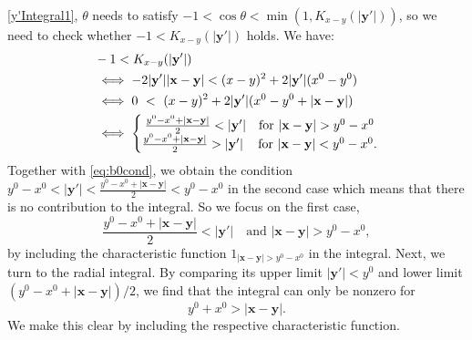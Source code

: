 \documentclass[b5paper,draft,openbib,12pt]{memoir}
\newcommand{\vx}{\mathbf{x}}
\newcommand{\vy}{\mathbf{y}}
\begin{document}
\eqref{y'Integral1}, \(\theta\) needs to satisfy 
\(-1<\cos\theta<\min(1,K_{x-y}(|\vy'|))\), so we 
need to check whether \(-1<K_{x-y}(|\vy'|)\) holds. 
We have:
\begin{align}\notag
    &-1 < K_{x-y}(|\vy'|) \\
    &\iff -2|\vy'||\vx-\vy|<(x-y)^2+2|\vy'|(x^0-y^0)\nonumber\\
    &\iff 0~<~(x-y)^2+2|\vy'|(x^0-y^0+|\vx-\vy|)\nonumber\\
    &\iff \left\{\begin{matrix}
    \frac{y^0-x^0+|\vx-\vy|}{2}<|\vy'|  \quad \text{for } |\vx-\vy|>y^0-x^0\\
    \frac{y^0-x^0+|\vx-\vy|}{2}>|\vy'| \quad \, \text{for } |\vx-\vy|<y^0-x^0.
    \end{matrix}\right.
\end{align}
Together with \eqref{eq:b0cond}, we obtain the 
condition \(y^0-x^0<|\vy'|<
\frac{y^0-x^0+|\vx-\vy|}{2}<y^0-x^0\) in the second 
case which means that there is no contribution to 
the integral. So we focus on the first case,
\begin{equation}
	\frac{y^0-x^0+|\vx-\vy|}{2}<|\vy'|  \quad \text{and } |\vx-\vy|>y^0-x^0,
\label{eq:xycond1}
\end{equation}
by including the characteristic function 
$1_{|\vx-\vy|>y^0-x^0}$ in the integral. Next, we turn 
to the radial integral. By comparing its upper 
limit $|\vy'|<y^0$ and lower limit $(y^0-x^0+
|\vx-\vy|)/2$, we find that the integral can only be 
nonzero for
\begin{equation}
	y^0+x^0>|\vx-\vy|.
	\label{eq:xycond2}
\end{equation}
We make this clear by including the respective 
characteristic function.
\end{document}
